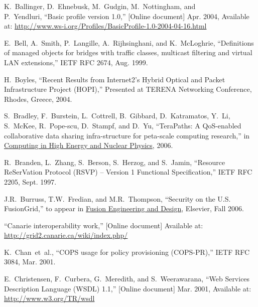 \documentclass[conference]{IEEEtran}
\begin{document}
%
%
%
\begin{thebibliography}{1}

K.~Ballinger, D.~Ehnebusk, M.~Gudgin, M.~Nottingham, and~~~~\\
P.~Yendluri, ``Basic profile version 1.0,'' [Online document] Apr. 2004,
Available at:
\url{http://www.ws-i.org/Profiles/BasicProfile-1.0-2004-04-16.html}

E.~Bell, A.~Smith, P.~Langille, A.~Rijhsinghani, and K.~McLoghrie,
``Definitions of managed objects for bridges with traffic classes, multicast
filtering and virtual LAN extensions,''
IETF RFC 2674, Aug. 1999.

H.~Boyles,
``Recent Results from Internet2's Hybrid Optical and Packet Infrastructure Project (HOPI),''
Presented at TERENA Networking Conference, Rhodes, Greece, 2004.

S.~Bradley, F.~Burstein, L.~Cottrell, B.~Gibbard, D.~Katramatos, Y.~Li,
S.~McKee, R.~Pope-scu, D.~Stampf, and D.~Yu,
``TeraPaths: A QoS-enabled collaborative data sharing infra-structure for
peta-scale computing research,''
in \underline{Computing in High Energy and Nuclear Physics}, 2006.

R.~Branden, L.~Zhang, S.~Berson, S.~Herzog, and S.~Jamin,
``Resource ReSerVation Protocol (RSVP) -- Version 1 Functional
Specification,'' IETF RFC 2205, Sept. 1997.

J.R.~Burruss, T.W.~Fredian, and M.R.~Thompson,
``Security on the U.S. FusionGrid,''
to appear in \underline{Fusion Engineering and Design}, Elsevier, Fall 2006.

``Canarie interoperability work,'' [Online document] Available at: \\
\url{http://grid2.canarie.ca/wiki/index.php/}

K.~Chan~et~al., ``COPS usage for policy provisioning (COPS-PR),''
IETF RFC 3084, Mar. 2001.

E.~Christensen, F.~Curbera, G.~Meredith, and S.~Weerawarana,
``Web Services Description Language (WSDL) 1.1,'' [Online document] Mar. 2001,
Available at: \url{http://www.w3.org/TR/wsdl}


\end{thebibliography}
\end{document}
